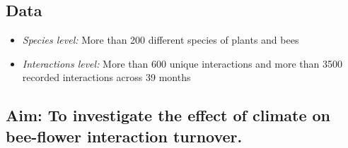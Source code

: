 \documentclass[20pt,margin=5mm, innermargin=6mm, blockverticalspace=6mm, colspace=6mm]{tikzposter}
\begin{document}
{\begin{minipage}[]{0.40\linewidth}
   \subsection*{Data}
    \begin{itemize}[itemsep=5pt,topsep=0pt,parsep=0pt,partopsep=0pt, leftmargin=20pt]
    \item \textit {Species level:} More than 200 different species of plants and bees
    \item \textit{Interactions level:} More than 600 unique interactions and more than 3500 recorded interactions across 39 months
    \end {itemize}
    \end{minipage}

    \subsection*{\centering Aim: \normalfont To investigate the effect of climate on bee-flower interaction turnover.} 
 }

\end{document}

